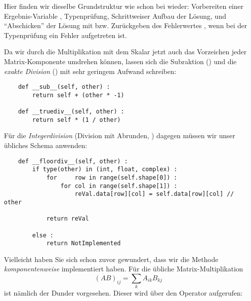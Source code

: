 Hier finden wir dieselbe Grundstruktur wie schon bei  wieder: Vorbereiten einer Ergebnis-Variable , Typenprüfung, Schrittweiser Aufbau der Lösung, und \enquote{Abschicken} der Lösung mit  bzw. Zurückgeben des Fehlerwertes , wenn bei der Typenprüfung ein Fehler aufgetreten ist.

Da wir durch die Multiplikation mit dem Skalar  jetzt auch das Vorzeichen jeder Matrix-Komponente umdrehen können, lassen sich die Subraktion () und die \emph{exakte Division} () mit sehr geringem Aufwand schreiben:

\begin{codebox}
\begin{verbatim}
    def __sub__(self, other) :
        return self + (other * -1)
    
    def __truediv__(self, other) :
        return self * (1 / other)
\end{verbatim}
\end{codebox}

Für die \emph{Integerdivision} (Division mit Abrunden, ) dagegen müssen wir unser übliches Schema anwenden:

\begin{codebox}
\begin{verbatim}
    def __floordiv__(self, other) :
        if type(other) in (int, float, complex) :
            for     row in range(self.shape[0]) :
                for col in range(self.shape[1]) :
                    reVal.data[row][col] = self.data[row][col] // other
            
            return reVal
        
        else :
            return NotImplemented
\end{verbatim}
\end{codebox}

Vielleicht haben Sie sich schon zuvor gewundert, dass wir die Methode  \emph{komponentenweise} implementiert haben. Für die übliche Matrix-Multiplikation 
\begin{equation*}
	(AB)_{ij} = \sum_{k} A_{ik} B_{kj}
\end{equation*}
ist nämlich der Dunder  vorgesehen. Dieser wird über den Operator  aufgerufen:


